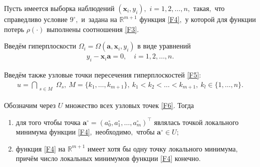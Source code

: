 \begin{theorem}[1]\label{th:1}Пусть имеется выборка наблюдений $(\mathbf{x}_{i}, y_{i}),$ $i=1, 2,  \ldots, n,$ такая$,$ что справедливо условие $9^{\circ},$ и~задана на $\mathbb{R}^{m+1}$ функция \eqref{F4}$,$ у которой для функции потерь $\rho(\cdot)$ выполнены соотношения \eqref{F3}$.$

Введём гиперплоскости $\Omega_{i} = \Omega(\mathbf{a}, \mathbf{x}_{i}, y_{i})$  в виде уравнений
\begin{gather} \label{F5}
y_{i}-\mathbf{x}_{i}\mathbf{a} = 0, \quad i= 1, 2, \ldots, n.
\end{gather}

Введём также узловые точки пересечения гиперплоскостей
\eqref{F5}$:$
\begin{gather} \label{F6}
u = \bigcap _{\substack{s \in M}}\Omega_{s}, ~ M = \{k_{1}, \ldots 
, k_{m+1}\}, ~ k_{1}<k_{2}< \ldots < k_{m+1}, ~ k_{l} \in \{1,\ldots,n\}.
\end{gather}

Обозначим через $U$  множество всех узловых точек \eqref{F6}$.$ Тогда

\begin{enumerate}
\item[\rm 1)]  для того чтобы точка $\mathbf{a}^{\circ} = (a_{0}^{\circ}, a_{1}^{\circ},  \ldots , a_{m}^{\circ})^{\top}$
являлась точкой локального минимума функции \eqref{F4}$,$
необходимо$,$ чтобы $\mathbf{a}^{\circ} \in U;$
\item[\rm 2)] функция \eqref{F4} на $\mathbb{R}^{m+1}$ имеет хотя бы одну точку локального минимума$,$ причём число локальных минимумов
функции \eqref{F4} конечно$.$
\end{enumerate}
\end{theorem}

